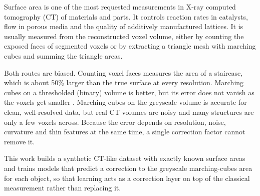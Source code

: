 Surface area is one of the most requested measurements in X-ray computed tomography (CT) of materials
and parts. It controls reaction rates in catalysts, flow in porous media and the quality of additively
manufactured lattices. It is usually measured from the reconstructed voxel volume, either by counting
the exposed faces of segmented voxels or by extracting a triangle mesh with marching cubes
\citep{lorensen1987} and summing the triangle areas.

Both routes are biased. Counting voxel faces measures the area of a staircase, which is about 50\%
larger than the true surface at every resolution. Marching cubes on a thresholded (binary) volume is
better, but its error does not vanish as the voxels get smaller \citep{kenmochi2000,svane2013}.
Marching cubes on the greyscale volume is accurate for clean, well-resolved data, but real CT volumes
are noisy and many structures are only a few voxels across. Because the error depends on resolution,
noise, curvature and thin features at the same time, a single correction factor cannot remove it.

This work builds a synthetic CT-like dataset with exactly known surface areas and trains models that
predict a correction to the greyscale marching-cubes area for each object, so that learning acts as a
correction layer on top of the classical measurement rather than replacing it.
